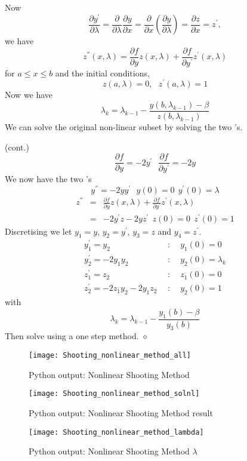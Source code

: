 Now 
\[\frac{\partial y^{'} }{\partial \lambda}=\frac{\partial}{\partial \lambda}\frac{\partial y}{\partial x}
=\frac{\partial }{\partial x}\left( \frac{\partial y}{\partial \lambda}\right)
=\frac{\partial z}{\partial x}=z^{'},\]
we have
\[ z^{''}(x,\lambda)=\frac{\partial f}{\partial y}z(x,\lambda)+\frac{\partial f}{\partial y^{'}}z^{'}(x,\lambda) \]
for $a \leq x \leq b$ and the initial conditions,
\[z(a,\lambda)=0, \ \ \ z^{'}(a,\lambda)=1 \]
Now we have 
\[\lambda_k=\lambda_{k-1}-\frac{y(b,\lambda_{k-1})-\beta}{z(b,\lambda_{k-1})}\]
We can solve the original non-linear subset  by solving the two 's.
\begin{example}(cont.)\\
\[\frac{\partial f}{\partial y}=-2y^{'} \ \ \ \frac{\partial f}{\partial y^{'}}=-2y\]
We now have the two 's
\[y^{''}=-2yy^{'} \ \ \ y(0)=0 \ \ y^{'}(0)=\lambda \]
\begin{eqnarray*}
z^{''}&=&\frac{\partial f}{\partial y}z(x,\lambda)+\frac{\partial f}{\partial y^{'}}z^{'}(x,\lambda)\\
&=&-2y^{'}z-2yz^{'} \ \ z(0)=0 \ \ z^{'}(0)=1 \end{eqnarray*}
Discretising we let $y_1=y$, $y_2=y^{'}$, $y_3=z$ and $y_4=z^{'}$.
\begin{eqnarray*}
y_1^{'}=y_2 &\ \ : \ \  &y_1(0)=0 \\
y_2^{'}=-2y_1y_2 &\ \ : \ \  &y_2(0)=\lambda_k \\
z_1^{'}=z_2 &\ \ : \ \  &z_1(0)=0 \\
z_2^{'}=-2z_1y_2-2y_1z_2 &\ \ : \ \  &y_2(0)=1 
\end{eqnarray*}
with
\[\lambda_k=\lambda_{k-1}-\frac{y_1(b)-\beta}{y_3(b)} \]
Then solve using a one step method.
$\diamond$
\end{example}


\begin{figure}[H]
\centering
\texttt{[image: Shooting\_nonlinear\_method\_all]}
\caption{Python output: Nonlinear Shooting Method}
\label{Shooting_method_nl}
\end{figure}

\begin{figure}[H]
\centering
\texttt{[image: Shooting\_nonlinear\_method\_solnl]}
\caption{Python output: Nonlinear Shooting Method result}
\label{Shooting_method_error}
\end{figure}

\begin{figure}[H]
\centering
\texttt{[image: Shooting\_nonlinear\_method\_lambda]}
\caption{Python output: Nonlinear Shooting Method $\lambda$}
\label{Shooting_method_error}
\end{figure}



